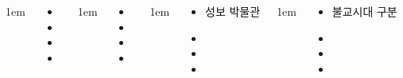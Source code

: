 \documentclass[20pt, a0paper, landscape]{tikzposter}
\begin{document}
\begin{columns}


			{
					\setlength{\leftmargini}{4em}
					\setlength{\labelsep} {1em}
				\begin{LARGE}
					\begin{itemize}
					\item 
					\item 
					\item 
					\item 
					\end{itemize}
				\end{LARGE}
			}

			{
					\setlength{\leftmargini}{4em}
					\setlength{\labelsep} {1em}
				\begin{LARGE}
					\begin{itemize}
					\item 
					\item 
					\item 
					\item 
					\end{itemize}
				\end{LARGE}
			}

			{
					\setlength{\leftmargini}{4em}
					\setlength{\labelsep} {1em}
				\begin{LARGE}
					\begin{itemize}
					\item 성보 박물관
					\item 
					\item 
					\item 
					\end{itemize}
				\end{LARGE}
			}





			{
					\setlength{\leftmargini}{3em}
					\setlength{\labelsep} {1em}
				\begin{LARGE}
					\begin{itemize}
					\item 불교시대 구분
					\item 
					\item 
					\item 
					\end{itemize}
				\end{LARGE}
			} %



\end{columns}
\end{document}
